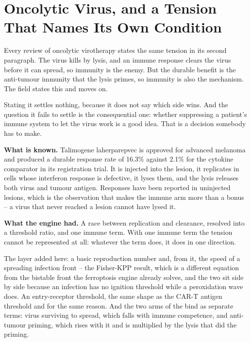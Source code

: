 \documentclass[11pt,twoside,openright]{report}
\begin{document}
\section{Oncolytic Virus, and a Tension That Names Its Own Condition}

Every review of oncolytic virotherapy states the same tension in its second paragraph. The virus kills by lysis, and an immune response clears the virus before it can spread, so immunity is the enemy. But the durable benefit is the anti-tumour immunity that the lysis primes, so immunity is also the mechanism. The field states this and moves on.

Stating it settles nothing, because it does not say which side wins. And the question it fails to settle is the consequential one: whether suppressing a patient's immune system to let the virus work is a good idea. That is a decision somebody has to make.

\textbf{What is known.} Talimogene laherparepvec is approved for advanced melanoma and produced a durable response rate of 16.3\% against 2.1\% for the cytokine comparator in its registration trial. It is injected into the lesion, it replicates in cells whose interferon response is defective, it lyses them, and the lysis releases both virus and tumour antigen. Responses have been reported in uninjected lesions, which is the observation that makes the immune arm more than a bonus -- a virus that never reached a lesion cannot have lysed it.

\textbf{What the engine had.} A race between replication and clearance, resolved into a threshold ratio, and one immune term. With one immune term the tension cannot be represented at all: whatever the term does, it does in one direction.

\begin{numbers}
The layer added here: a basic reproduction number and, from it, the speed of a spreading infection front -- the Fisher-KPP result, which is a different equation from the bistable front the ferroptosis engine already solves, and the two sit side by side because an infection has no ignition threshold while a peroxidation wave does. An entry-receptor threshold, the same shape as the CAR-T antigen threshold and for the same reason. And the two arms of the bind as separate terms: virus surviving to spread, which falls with immune competence, and anti-tumour priming, which rises with it and is multiplied by the lysis that did the priming.
\end{numbers}
\end{document}
